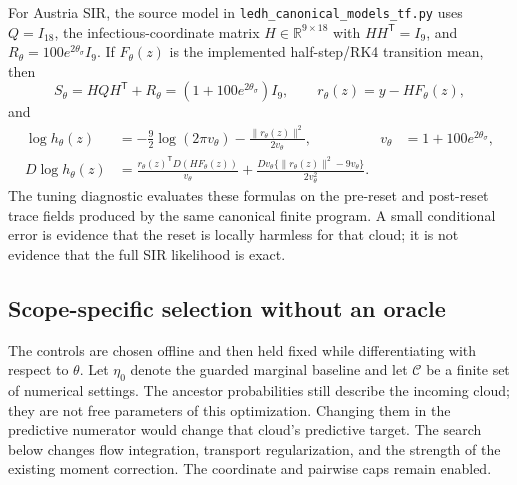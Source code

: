 For Austria SIR, the source model in
\texttt{ledh\_canonical\_models\_tf.py} uses $Q=I_{18}$,
the infectious-coordinate matrix $H\in\mathbb R^{9\times18}$ with
$HH^\mathsf T=I_9$, and
$R_\theta=100e^{2\theta_\sigma}I_9$.  If $F_\theta(z)$ is the implemented
half-step/RK4 transition mean, then
\[
 S_\theta=HQH^\mathsf T+R_\theta
       =\left(1+100e^{2\theta_\sigma}\right)I_9,\qquad
 r_\theta(z)=y-HF_\theta(z),
\]
and
\begin{align}
 \log h_\theta(z)
 &= -\frac{9}{2}\log(2\pi v_\theta)
    -\frac{\|r_\theta(z)\|^2}{2v_\theta},
 &v_\theta&=1+100e^{2\theta_\sigma},\\
 D\log h_\theta(z)
 &=\frac{r_\theta(z)^\mathsf T D(HF_\theta(z))}{v_\theta}
   +\frac{Dv_\theta\{\|r_\theta(z)\|^2-9v_\theta\}}
          {2v_\theta^2}.
 \label{eq:bf-hd-sir-predictive-integrand}
\end{align}
The tuning diagnostic evaluates these formulas on the pre-reset and
post-reset trace fields produced by the same canonical finite program.
A small conditional error is evidence that the reset is locally harmless for
that cloud; it is not evidence that the full SIR likelihood is exact.

\subsection{Scope-specific selection without an oracle}

The controls are chosen offline and then held fixed while differentiating
with respect to $\theta$.  Let $\eta_0$ denote the guarded marginal baseline
and let $\mathcal C$ be a finite set of numerical settings.  The ancestor
probabilities still describe the incoming cloud; they are not free parameters
of this optimization.  Changing them in the predictive numerator would change
that cloud's predictive target.  The search below changes flow integration,
transport regularization, and the strength of the existing moment correction.
The coordinate and pairwise caps remain enabled.


